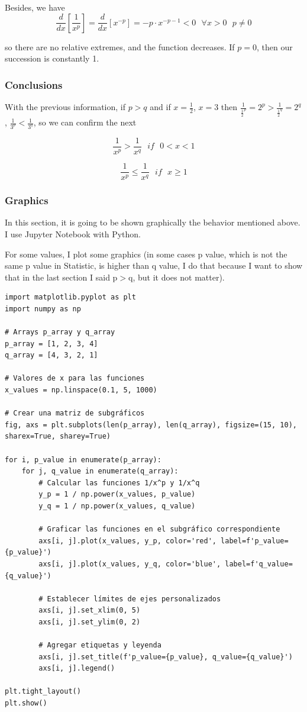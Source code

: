 \documentclass{article}
\begin{document}
Besides, we have
\[
	\frac{d}{dx}\left[ \frac{1}{{x^p}} \right] = \frac{d}{dx}\left[x^{-p} \right] = -p \cdot x^{-p-1} < 0 \textbf{ } \forall x>0 \textbf{ } p\neq 0
\]

so there are no relative extremes, and the function decreases. If \(p = 0\), then our succession is constantly 1.

\subsubsection{Conclusions}

With the previous information, if $p>q$ and if $x=\frac{1}{2}$, $x=3$ then $\frac{1}{\frac{1}{2}^p}={2^p} > \frac{1}{\frac{1}{2}^q}={2^q}$, $\frac{1}{3^p} < \frac{1}{3^q}$, so we can confirm the next

\[
	\frac{1}{{x^p}} > \frac{1}{{x^q}} \textbf{ } if \textbf{ } 0<x<1
\]

\[
	\frac{1}{{x^p}} \leq \frac{1}{{x^q}} \textbf{ } if \textbf{ } x \geq 1
\]

\subsubsection{Graphics}

In this section, it is going to be shown graphically the behavior mentioned above. I use Jupyter Notebook with Python.

For some values, I plot some graphics (in some cases p value, which is not the same p value in Statistic, is higher than q value, I do that because I want to show that in the last section I said p\(>\)q, but it does not matter).

\begin{verbatim}
import matplotlib.pyplot as plt
import numpy as np

# Arrays p_array y q_array
p_array = [1, 2, 3, 4]
q_array = [4, 3, 2, 1]

# Valores de x para las funciones
x_values = np.linspace(0.1, 5, 1000)

# Crear una matriz de subgráficos
fig, axs = plt.subplots(len(p_array), len(q_array), figsize=(15, 10), sharex=True, sharey=True)

for i, p_value in enumerate(p_array):
    for j, q_value in enumerate(q_array):
        # Calcular las funciones 1/x^p y 1/x^q
        y_p = 1 / np.power(x_values, p_value)
        y_q = 1 / np.power(x_values, q_value)
        
        # Graficar las funciones en el subgráfico correspondiente
        axs[i, j].plot(x_values, y_p, color='red', label=f'p_value={p_value}')
        axs[i, j].plot(x_values, y_q, color='blue', label=f'q_value={q_value}')
        
        # Establecer límites de ejes personalizados
        axs[i, j].set_xlim(0, 5)
        axs[i, j].set_ylim(0, 2)
        
        # Agregar etiquetas y leyenda
        axs[i, j].set_title(f'p_value={p_value}, q_value={q_value}')
        axs[i, j].legend()

plt.tight_layout()
plt.show()
\end{verbatim}
\end{document}
